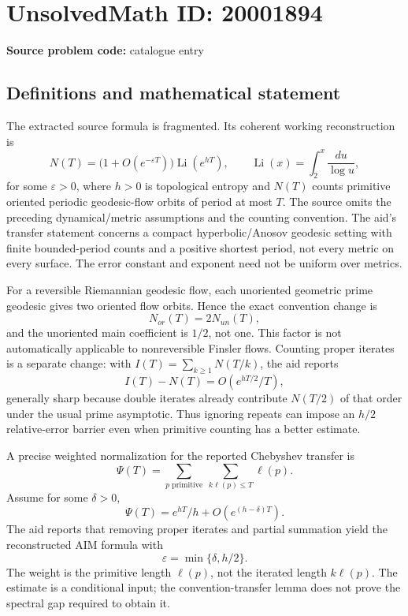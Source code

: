 \documentclass[11pt]{article}
\begin{document}
\section*{UnsolvedMath ID: 20001894}
\textbf{Source problem code:} catalogue entry
\subsection{Definitions and mathematical statement}
The extracted source formula is fragmented. Its coherent working reconstruction is
\[
 N(T)=\bigl(1+O(e^{-\varepsilon T})\bigr)
       \operatorname{Li}(e^{hT}),\qquad
 \operatorname{Li}(x)=\int_2^x\frac{du}{\log u},
\]
for some \(\varepsilon>0\), where \(h>0\) is topological entropy and \(N(T)\) counts primitive oriented periodic geodesic-flow orbits of period at most \(T\). The source omits the preceding dynamical/metric assumptions and the counting convention. The aid's transfer statement concerns a compact hyperbolic/Anosov geodesic setting with finite bounded-period counts and a positive shortest period, not every metric on every surface. The error constant and exponent need not be uniform over metrics.

For a reversible Riemannian geodesic flow, each unoriented geometric prime geodesic gives two oriented flow orbits. Hence the exact convention change is
\[
 N_{or}(T)=2N_{un}(T),
\]
and the unoriented main coefficient is \(1/2\), not one. This factor is not automatically applicable to nonreversible Finsler flows. Counting proper iterates is a separate change: with \(I(T)=\sum_{k\ge1}N(T/k)\), the aid reports
\[
 I(T)-N(T)=O(e^{hT/2}/T),
\]
generally sharp because double iterates already contribute \(N(T/2)\) of that order under the usual prime asymptotic. Thus ignoring repeats can impose an \(h/2\) relative-error barrier even when primitive counting has a better estimate.

A precise weighted normalization for the reported Chebyshev transfer is
\[
 \Psi(T)=\sum_{p\text{ primitive}}\ \sum_{k\ell(p)\le T}\ell(p).
\]
Assume for some \(\delta>0\),
\[
 \Psi(T)=e^{hT}/h+O(e^{(h-\delta)T}).
\]
The aid reports that removing proper iterates and partial summation yield the reconstructed AIM formula with
\[
 \varepsilon=\min\{\delta,h/2\}.
\]
The weight is the primitive length \(\ell(p)\), not the iterated length \(k\ell(p)\). The estimate is a conditional input; the convention-transfer lemma does not prove the spectral gap required to obtain it.
\end{document}
